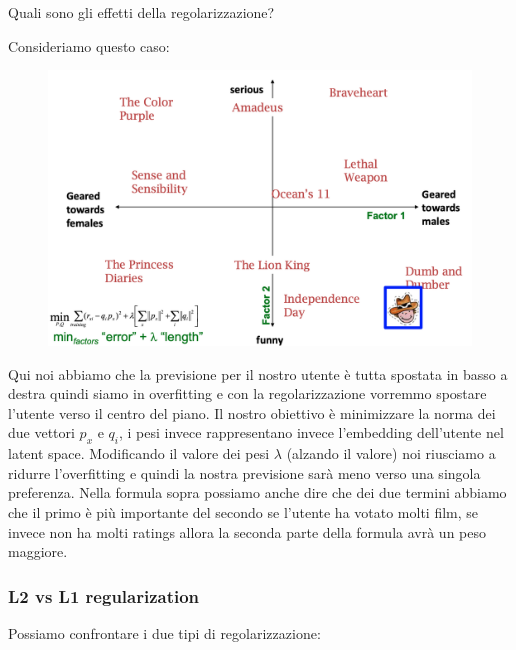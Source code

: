 \documentclass[14pt]{extreport}
\begin{document}
Quali sono gli effetti della regolarizzazione?

Consideriamo questo caso:

\begin{figure}[H] 
\centering
\includegraphics[width=0.7\linewidth]{526.jpeg}
\end{figure}

Qui noi abbiamo che la previsione per il nostro utente è tutta spostata in basso a destra quindi siamo in overfitting e con la regolarizzazione vorremmo 
spostare l'utente verso il centro del piano.
Il nostro obiettivo è minimizzare la norma dei due vettori $p_x$ e $q_i$, i pesi invece rappresentano invece l'embedding dell'utente nel latent space.
Modificando il valore dei pesi $\lambda$ (alzando il valore) noi riusciamo a ridurre l'overfitting e quindi la nostra previsione sarà meno verso una singola preferenza.
Nella formula sopra possiamo anche dire che dei due termini abbiamo che il primo è più importante del secondo se l'utente ha votato molti film, se invece non ha molti 
ratings allora la seconda parte della formula avrà un peso maggiore.

\subsubsection{L2 vs L1 regularization}

Possiamo confrontare i due tipi di regolarizzazione:
\end{document}
